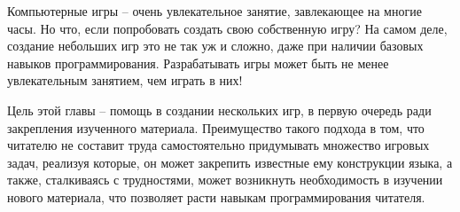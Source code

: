 \documentclass[../sparc.tex]{subfiles}
\begin{document}
Компьютерные игры -- очень увлекательное занятие, завлекающее на многие часы. Но
что, если попробовать создать свою собственную игру?  На самом деле, создание
небольших игр это не так уж и сложно, даже при наличии базовых навыков
программирования.  Разрабатывать игры может быть не менее увлекательным
занятием, чем играть в них!

Цель этой главы -- помощь в создании нескольких игр, в первую очередь ради
закрепления изученного материала.  Преимущество такого подхода в том, что
читателю не составит труда самостоятельно придумывать множество игровых задач,
реализуя которые, он может закрепить известные ему конструкции языка, а также,
сталкиваясь с трудностями, может возникнуть необходимость в изучении нового
материала, что позволяет расти навыкам программирования читателя.
\end{document}
